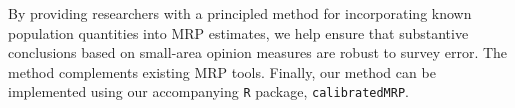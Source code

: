 By providing researchers with a principled method for incorporating known population quantities into MRP estimates, we help ensure that substantive conclusions based on small-area opinion measures are robust to survey error. 
The method complements existing MRP tools. 
Finally, our method can be implemented using our accompanying \texttt{R} package, \texttt{calibratedMRP}.

